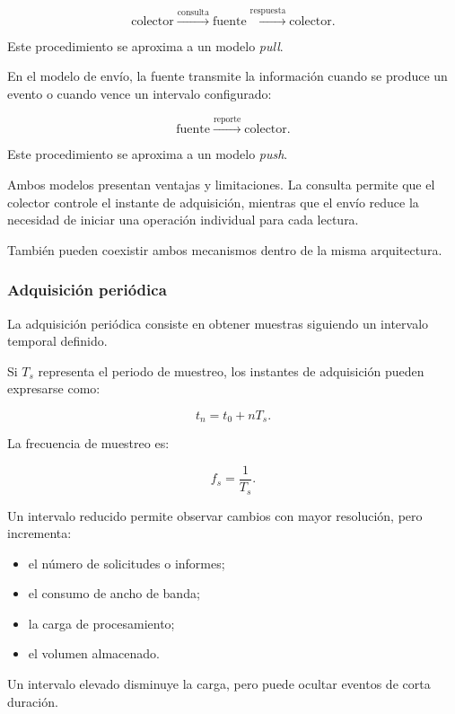 \[
    \text{colector}
    \xrightarrow{\text{consulta}}
    \text{fuente}
    \xrightarrow{\text{respuesta}}
    \text{colector}.
\]

Este procedimiento se aproxima a un modelo \textit{pull}.

En el modelo de envío, la fuente transmite la información cuando se
produce un evento o cuando vence un intervalo configurado:

\[
    \text{fuente}
    \xrightarrow{\text{reporte}}
    \text{colector}.
\]

Este procedimiento se aproxima a un modelo \textit{push}.

Ambos modelos presentan ventajas y limitaciones. La consulta permite que
el colector controle el instante de adquisición, mientras que el envío
reduce la necesidad de iniciar una operación individual para cada
lectura.

También pueden coexistir ambos mecanismos dentro de la misma
arquitectura.


\subsubsection*{Adquisición periódica}

La adquisición periódica consiste en obtener muestras siguiendo un
intervalo temporal definido.

Si \(T_s\) representa el periodo de muestreo, los instantes de
adquisición pueden expresarse como:

\[
    t_n
    =
    t_0
    +
    nT_s.
\]

La frecuencia de muestreo es:

\[
    f_s
    =
    \frac{1}{T_s}.
\]

Un intervalo reducido permite observar cambios con mayor resolución,
pero incrementa:

\begin{itemize}
    \item el número de solicitudes o informes;

    \item el consumo de ancho de banda;

    \item la carga de procesamiento;

    \item el volumen almacenado.
\end{itemize}

Un intervalo elevado disminuye la carga, pero puede ocultar eventos de
corta duración.

